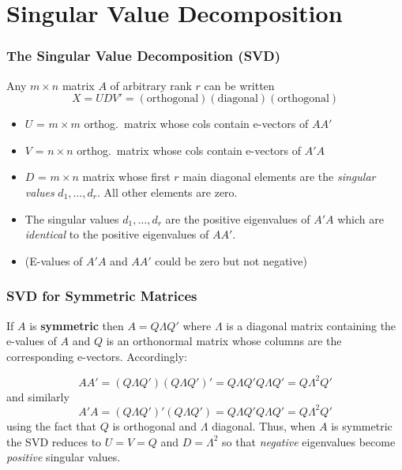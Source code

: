 \section{Singular Value Decomposition}
\begin{frame}
  \frametitle{The Singular Value Decomposition (SVD)}
  
Any $m \times n$ matrix $A$ of arbitrary rank $r$ can be written 
	$$X = UDV' = (\mbox{orthogonal})(\mbox{diagonal})(\mbox{orthogonal})$$
  \vspace{-2em}
	\begin{itemize}
	 	\item $U$ = $m\times m$ orthog.\ matrix whose cols contain e-vectors of $AA'$
	 	\item $V$ = $n\times n$ orthog.\ matrix whose cols contain e-vectors of $A'A$
	 	\item $D$ = $m\times n$ matrix whose first $r$ main diagonal elements are the  \emph{singular values} $d_1, \hdots, d_r$. All other elements are zero.
	 	\item The singular values $d_1, \hdots, d_r$ are the positive eigenvalues of $A'A$ which are \emph{identical} to the positive eigenvalues of $AA'$.
    \item (E-values of $A'A$ and $AA'$ could be zero but not negative)
	 \end{itemize} 
\end{frame}
\begin{frame}
  \frametitle{SVD for Symmetric Matrices}
  
If $A$ is \textbf{symmetric} then $A = Q\Lambda Q'$ where $\Lambda$ is a diagonal matrix containing the e-values of $A$ and $Q$ is an orthonormal matrix whose columns are the corresponding e-vectors. Accordingly:

  \[
    AA' = (Q\Lambda Q')(Q\Lambda Q')' = Q \Lambda Q' Q \Lambda Q' = Q \Lambda^2 Q'
  \]
  and similarly
  \[
    A'A = (Q\Lambda Q')'(Q\Lambda Q') = Q \Lambda Q' Q \Lambda Q' = Q \Lambda^2 Q'
  \]
  using the fact that $Q$ is orthogonal and $\Lambda$ diagonal.
  Thus, when $A$ is symmetric the SVD reduces to $U = V = Q$ and $D =  \Lambda^2$ so that \emph{negative} eigenvalues become \emph{positive} singular values.
\end{frame}

